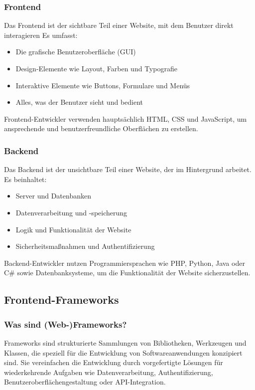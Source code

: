 \subsubsection{Frontend}
Das Frontend ist der sichtbare Teil einer Website, mit dem Benutzer direkt interagieren
Es umfasst:
\begin{itemize}
	\item Die grafische Benutzeroberfläche (GUI)
	\item Design-Elemente wie Layout, Farben und Typografie
	\item Interaktive Elemente wie Buttons, Formulare und Menüs
	\item Alles, was der Benutzer sieht und bedient
\end{itemize}
Frontend-Entwickler verwenden hauptsächlich HTML, CSS und JavaScript, um ansprechende und benutzerfreundliche Oberflächen zu erstellen.\textit{\cite{ionos_backend_frontend}}


\subsubsection{Backend}
Das Backend ist der \glqq unsichtbare\grqq{} Teil einer Website, der im Hintergrund arbeitet.
Es beinhaltet:
\begin{itemize}
	\item Server und Datenbanken
	\item Datenverarbeitung und -speicherung
	\item Logik und Funktionalität der Website
	\item Sicherheitsmaßnahmen und Authentifizierung
\end{itemize}
Backend-Entwickler nutzen Programmiersprachen wie PHP, Python, Java oder C\# sowie Datenbanksysteme, um die Funktionalität der Website sicherzustellen.\textit{\cite{ionos_backend_frontend}}

\subsection{Frontend-Frameworks}
\subsubsection{Was sind (Web-)Frameworks?}
Frameworks sind strukturierte Sammlungen von Bibliotheken, Werkzeugen und Klassen, die speziell für die Entwicklung von Softwareanwendungen konzipiert sind. Sie vereinfachen die Entwicklung durch vorgefertigte Lösungen für wiederkehrende Aufgaben wie Datenverarbeitung, Authentifizierung, Benutzeroberflächengestaltung oder API-Integration.\textit{\cite{madurapperuma2022state, shetty2020review}}

